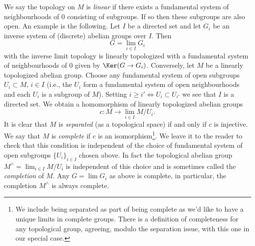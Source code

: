\medskip\noindent
We say the topology on $M$ is {\it linear} if there exists a fundamental
system of neighbourhoods of $0$ consisting of subgroups. If so then these
subgroups are also open. An example is the following. Let $I$ be a directed set
and let $G_i$ be an inverse system of (discrete)
abelian groups over $I$. Then
$$
G = \lim_{i \in I} G_i
$$
with the inverse limit topology is linearly topologized with a fundamental
system of neighbourhoods of $0$ given by $\Ker(G \to G_i)$.
Conversely, let $M$ be a linearly topologized abelian group.
Choose any fundamental system of open subgroups $U_i \subset M$, $i \in I$
(i.e., the $U_i$ form a fundamental system of open neighbourhoods and
each $U_i$ is a subgroup of $M$). Setting
$i \geq i' \Leftrightarrow U_i \subset U_{i'}$ we see that $I$
is a directed set. We obtain a homomorphism of
linearly topologized abelian groups
$$
c : M \longrightarrow \lim_{i \in I} M/U_i.
$$
It is clear that $M$ is {\it separated} (as a topological space)
if and only if $c$ is injective. We say that $M$ is {\it complete}
if $c$ is an isomorphism\footnote{We include being separated as part
of being complete as we'd like to have a unique limits in complete
groups. There is a definition of completeness for any topological group,
agreeing, modulo the separation issue, with this one in our special case.}.
We leave it to the reader to check that this condition is independent of
the choice of fundamental system of open subgroups $\{U_i\}_{i \in I}$
chosen above. In fact the topological abelian group
$M^\wedge = \lim_{i \in I} M/U_i$ is independent of this
choice and is sometimes called the {\it completion} of $M$.
Any $G = \lim G_i$ as above is complete, in particular,
the completion $M^\wedge$ is always complete.

